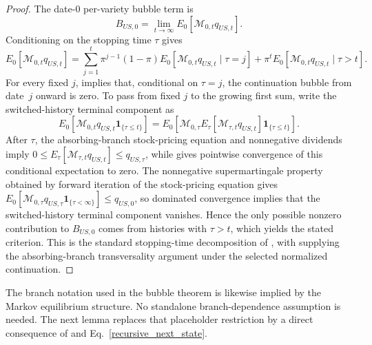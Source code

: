 \documentclass{article}
\def\green#1{#1}%
\begin{document}
\begin{proof}
The date-0 per-variety bubble term is
\[
B_{US,0}
=
\lim_{t\to\infty}E_0\!\left[\mathcal M_{0,t}q_{US,t}\right].
\]
Conditioning on the stopping time $\tau$ gives
\[
E_0\!\left[\mathcal M_{0,t}q_{US,t}\right]
=
\sum_{j=1}^{t}\pi^{j-1}(1-\pi)E_0\!\left[\mathcal M_{0,t}q_{US,t}\mid \tau=j\right]
+
\pi^t E_0\!\left[\mathcal M_{0,t}q_{US,t}\mid \tau>t\right].
\]
For every fixed $j$,  implies that, conditional on $\tau=j$, the continuation bubble from date~$j$ onward is zero. To pass from fixed $j$ to the growing first sum, write the switched-history terminal component as
\[
E_0\!\left[\mathcal M_{0,t}q_{US,t}\mathbf 1_{\{\tau\le t\}}\right]
=
E_0\!\left[\mathcal M_{0,\tau}
E_\tau\!\left[\mathcal M_{\tau,t}q_{US,t}\right]
\mathbf 1_{\{\tau\le t\}}\right].
\]
After $\tau$, the absorbing-branch stock-pricing equation and nonnegative dividends imply
$0\le E_\tau[\mathcal M_{\tau,t}q_{US,t}]\le q_{US,\tau}$, while  gives pointwise convergence of this conditional expectation to zero. The nonnegative supermartingale property obtained by forward iteration of the stock-pricing equation gives
$E_0[\mathcal M_{0,\tau}q_{US,\tau}\mathbf 1_{\{\tau<\infty\}}]\le q_{US,0}$, so dominated convergence implies that the switched-history terminal component vanishes. Hence the only possible nonzero contribution to $B_{US,0}$ comes from histories with $\tau>t$, which yields the stated criterion. This is the standard stopping-time decomposition of \citet{hirano2025technological}, with  supplying the absorbing-branch transversality argument \green{under the selected normalized continuation}.
\end{proof}

The branch notation used in the bubble theorem is likewise implied by the Markov equilibrium structure. No standalone branch-dependence assumption is needed. The next lemma replaces that placeholder restriction by a direct consequence of  and Eq.~\eqref{recursive_next_state}.
\end{document}
